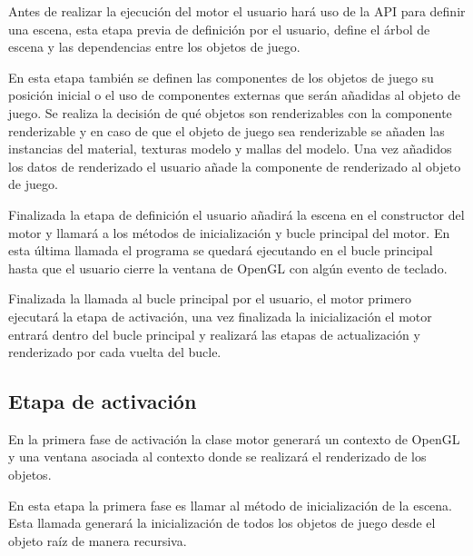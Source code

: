 \documentclass[a4paper, 17pt]{book}
\begin{document}
Antes de realizar la ejecución del motor el usuario hará uso de la API para definir una escena, esta etapa previa de definición por el usuario,
define el árbol de escena y las dependencias entre los objetos de juego. 

\vspace{1mm} %

En esta etapa también se definen las componentes de los objetos de juego su posición inicial o el uso de componentes externas que serán añadidas
al objeto de juego. Se realiza la decisión de qué objetos son renderizables con la componente renderizable y en caso de que el objeto de juego
sea renderizable se añaden las instancias del material, texturas modelo y mallas del modelo. Una vez añadidos los datos de renderizado el usuario
añade la componente de renderizado al objeto de juego. 

\vspace{1mm} %

Finalizada la etapa de definición el usuario añadirá la escena en el constructor del motor y llamará a los métodos de inicialización y bucle
principal del motor. En esta última llamada el programa se quedará ejecutando en el bucle principal hasta que el usuario cierre la ventana de
OpenGL con algún evento de teclado.

\vspace{1mm} %

Finalizada la llamada al bucle principal por el usuario, el motor primero ejecutará la etapa de activación, una vez finalizada la inicialización
el motor entrará dentro del bucle principal y realizará las etapas de actualización y renderizado por cada vuelta del bucle.

\subsection{Etapa de activación}
\label{subsec:activacion}

En la primera fase de activación la clase motor generará un contexto de OpenGL y una ventana asociada al contexto donde se realizará el renderizado
de los objetos.

\vspace{1mm} %

En esta etapa la primera fase es llamar al método de inicialización de la escena. Esta llamada generará la inicialización de todos los objetos
de juego desde el objeto raíz de manera recursiva.
\end{document}
